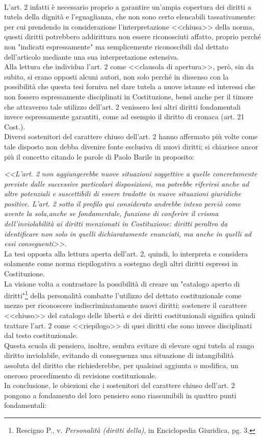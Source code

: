 \\L'art. 2 infatti è necessario proprio a garantire un'ampia copertura dei diritti a tutela della dignità e l'eguaglianza, che non sono certo elencabili tassativamente: per cui prendendo in considerazione l'interpretazione <<chiusa>> della norma, questi diritti potrebbero addirittura non essere riconosciuti affatto, proprio perché non "indicati espressamente" ma semplicemente riconoscibili dal dettato dell'articolo mediante una sua interpretazione estensiva. 
\\Alla lettura che individua l'art. 2 come <<clausola di apertura>>, però, sin da subito, si erano opposti alcuni autori, non solo perché in dissenso con la possibilità che questa tesi forniva nel dare tutela a nuove istanze ed interessi che non fossero espressamente disciplinati in Costituzione,  bensì anche per il timore che attraverso tale utilizzo dell’art. 2 venissero lesi altri diritti fondamentali  invece espressamente garantiti, come ad esempio il diritto di cronaca (art. 21 Cost.).
\\Diversi sostenitori del carattere chiuso dell'art. 2 hanno affermato più volte come tale disposto non debba divenire fonte esclusiva di nuovi diritti; si chiarisce ancor più il concetto citando le parole di Paolo Barile in proposito: 

\textit{<<L’art. 2 non aggiungerebbe nuove situazioni soggettive a quelle concretamente previste dalle successive particolari disposizioni, ma potrebbe riferirsi anche ad altre potenziali e suscettibili di essere tradotte in nuove situazioni giuridiche positive. L’art. 2 sotto il profilo qui considerato andrebbe inteso perciò come avente la sola,anche se fondamentale, funzione di conferire il crisma dell’inviolabilità ai diritti menzionati in Costituzione: diritti peraltro da identificare non solo in quelli dichiaratamente enunciati, ma anche in quelli ad essi conseguenti>>.} 
\\La tesi opposta alla lettura aperta dell'art. 2, quindi, lo interpreta e considera solamente come norma riepilogativa a sostegno degli altri diritti espressi in Costituzione. 
\\La visione volta a contrastare la possibilità di creare un "catalogo aperto di diritti"\footnote{Rescigno P., v. \textit{Personalità (diritti della)}, in Enciclopedia Giuridica, pg. 3.} della personalità combatte l'utilizzo del dettato costituzionale come mezzo per riconoscere indiscriminatamente nuovi diritti; sostenere il carattere <<chiuso>> del catalogo delle  libertà e dei diritti costituzionali significa quindi trattare l'art. 2 come <<riepilogo>> di quei diritti che sono invece disciplinati dal testo costituzionale. 
\\Questa scuola di pensiero, inoltre, sembra evitare di elevare ogni tutela al rango diritto inviolabile, evitando di conseguenza una situazione di intangibilità assoluta del diritto che richiederebbe, per qualsiasi aggiunta o modifica, un oneroso procedimento di revisione costituzionale.
\\In conclusione, le obiezioni che i sostenitori del carattere chiuso dell'art. 2 pongono a fondamento del loro pensiero sono riassumibili in quattro punti fondamentali:

